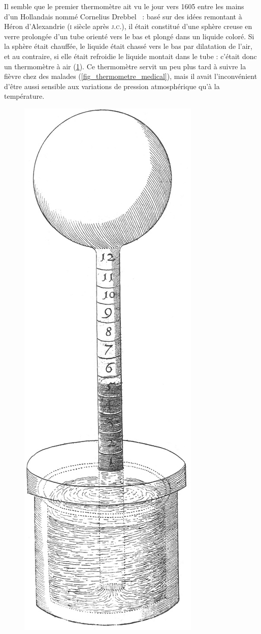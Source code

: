 	Il semble que le premier thermomètre ait vu le jour vers 1605 entre les mains d'un Hollandais nommé Cornelius Drebbel~\cite{locqueneux1996} : basé sur des idées remontant à Héron d'Alexandrie (\textsc{i}\xspace siècle après \textsc{j.c.}), il était constitué d'une sphère creuse en verre prolongée d'un tube orienté vers le bas et plongé dans un liquide coloré. Si la sphère était chauffée, le liquide était chassé vers le bas par dilatation de l'air, et au contraire, si elle était refroidie le liquide montait dans le tube : c'était donc un thermomètre à air (\cref{fig_thermometre_air}). Ce thermomètre servit un peu plus tard à suivre la fièvre chez des malades (\cref{fig_thermometre_medical}), mais il avait l'inconvénient d'être aussi sensible aux variations de pression atmosphérique qu'à la température.
	
	\begin{figure}
		\begin{center}
			\includegraphics[height=0.6\textwidth]{images/thermometre_air_1626.jpg}
		\end{center}
		\label{fig_thermometre_air}
	\end{figure}
	
